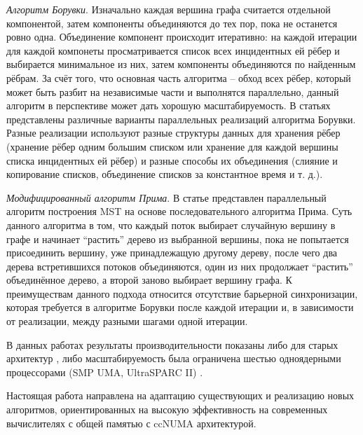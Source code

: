 \documentclass{article}
\begin{document}
\textit{Алгоритм Борувки}. 
Изначально каждая вершина графа считается отдельной компонентой, затем компоненты объединяются до тех пор, пока не останется ровно одна.
Объединение компонент происходит итеративно: на каждой итерации для каждой компонеты просматривается список всех инцидентных ей рёбер и выбирается минимальное из них, затем компоненты объединяются по найденным рёбрам.
За счёт того, что основная часть алгоритма -- обход всех рёбер, который может быть разбит на независимые части и выполнятся параллельно, данный алгоритм в перспективе может дать хорошую масштабируемость.
В статьях \cite{dense-mst,boruvka-prima,boruvka-cm5} представлены различные варианты параллельных реализаций алгоритма Борувки.
Разные реализации используют разные структуры данных для хранения рёбер (хранение рёбер одним большим списком или хранение для каждой вершины списка инцидентных ей рёбер) и разные способы их объединения (слияние и копирование списков, объединение списков за константное время и т. д.).

\textit{Модифицированный алгоритм Прима}.
В статье \cite{boruvka-prima} представлен параллельный алгоритм построения MST на основе последовательного алгоритма Прима.
Суть данного алгоритма в том, что каждый поток выбирает случайную вершину в графе и начинает ``растить'' дерево из выбранной вершины, пока не попытается присоединить вершину, уже принадлежащую другому дереву, после чего два дерева встретившихся потоков объединяются, один из них продолжает ``растить'' объединённое дерево, а второй заново выбирает вершину графа. %
К преимуществам данного подхода относится отсутствие барьерной синхронизации, которая требуется в алгоритме Борувки после каждой итерации и, в зависимости от реализации, между разными шагами одной итерации.

В данных работах \cite{dense-mst,boruvka-prima,boruvka-cm5} результаты производительности показаны либо для старых архитектур \cite{dense-mst,boruvka-cm5}, либо масштабируемость была ограничена шестью одноядерными процессорами (SMP  UMA, UltraSPARC II) \cite{boruvka-prima} .

Настоящая работа направлена на адаптацию существующих и реализацию новых алгоритмов, ориентированных на высокую эффективность на современных вычислителях с общей памятью с ccNUMA архитектурой.
\end{document}
